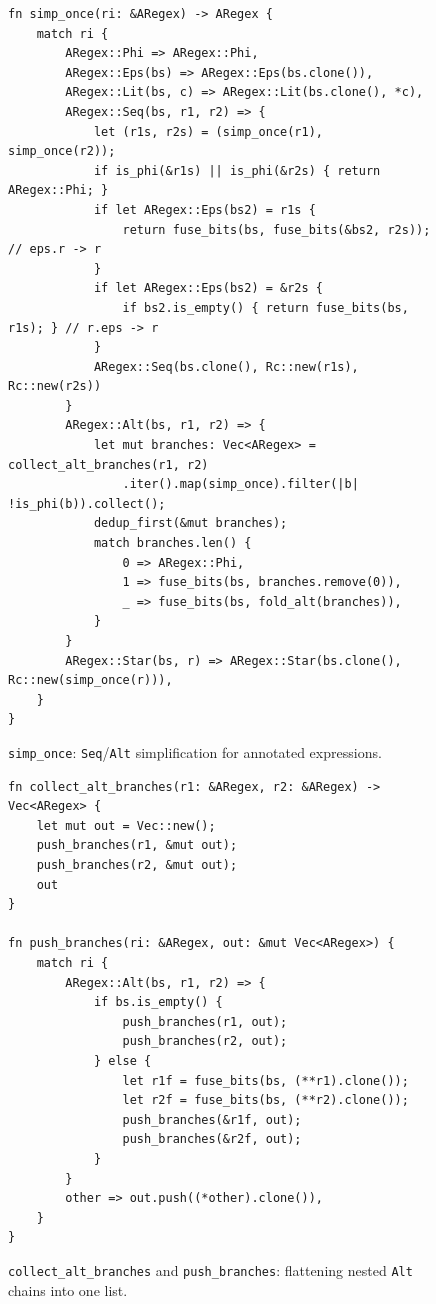 \begin{figure}[H]
\small
\begin{verbatim}
fn simp_once(ri: &ARegex) -> ARegex {
    match ri {
        ARegex::Phi => ARegex::Phi,
        ARegex::Eps(bs) => ARegex::Eps(bs.clone()),
        ARegex::Lit(bs, c) => ARegex::Lit(bs.clone(), *c),
        ARegex::Seq(bs, r1, r2) => {
            let (r1s, r2s) = (simp_once(r1), simp_once(r2));
            if is_phi(&r1s) || is_phi(&r2s) { return ARegex::Phi; }
            if let ARegex::Eps(bs2) = r1s {
                return fuse_bits(bs, fuse_bits(&bs2, r2s));  // eps.r -> r
            }
            if let ARegex::Eps(bs2) = &r2s {
                if bs2.is_empty() { return fuse_bits(bs, r1s); } // r.eps -> r
            }
            ARegex::Seq(bs.clone(), Rc::new(r1s), Rc::new(r2s))
        }
        ARegex::Alt(bs, r1, r2) => {
            let mut branches: Vec<ARegex> = collect_alt_branches(r1, r2)
                .iter().map(simp_once).filter(|b| !is_phi(b)).collect();
            dedup_first(&mut branches);
            match branches.len() {
                0 => ARegex::Phi,
                1 => fuse_bits(bs, branches.remove(0)),
                _ => fuse_bits(bs, fold_alt(branches)),
            }
        }
        ARegex::Star(bs, r) => ARegex::Star(bs.clone(), Rc::new(simp_once(r))),
    }
}
\end{verbatim}
\caption{\texttt{simp\_once}: \texttt{Seq}/\texttt{Alt} simplification for
annotated expressions.
}
\label{fig:simp-rust}
\end{figure}

%

\begin{figure}[H]
\small
\begin{verbatim}
fn collect_alt_branches(r1: &ARegex, r2: &ARegex) -> Vec<ARegex> {
    let mut out = Vec::new();
    push_branches(r1, &mut out);
    push_branches(r2, &mut out);
    out
}

fn push_branches(ri: &ARegex, out: &mut Vec<ARegex>) {
    match ri {
        ARegex::Alt(bs, r1, r2) => {
            if bs.is_empty() {
                push_branches(r1, out);
                push_branches(r2, out);
            } else {
                let r1f = fuse_bits(bs, (**r1).clone());
                let r2f = fuse_bits(bs, (**r2).clone());
                push_branches(&r1f, out);
                push_branches(&r2f, out);
            }
        }
        other => out.push((*other).clone()),
    }
}
\end{verbatim}
\caption{\texttt{collect\_alt\_branches} and \texttt{push\_branches}:
flattening nested \texttt{Alt} chains into one list.}
\label{fig:collect-alt-branches-rust}
\end{figure}


